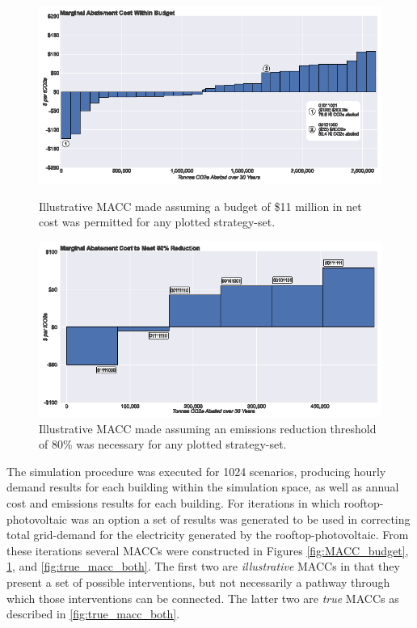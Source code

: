 \documentclass[twocolumn, a4paper,10pt]{article}
\begin{document}
\begin{figure}[hbpt]
\centering
\begin{minipage}[b]{.45\textwidth}
    \hspace*{-1.05cm}\includegraphics[scale=1.0]{figures/budget_macc.eps}
    \caption{Illustrative MACC made assuming a budget of \$11 million in net cost was permitted for any plotted strategy-set.}
    \label{fig:MACC_budget}
\end{minipage}\qquad
\begin{minipage}[b]{.45\textwidth}
    \hspace*{-.4cm}\includegraphics[scale=1.0]{figures/threshold_macc.eps}
    \caption{Illustrative MACC made assuming an emissions reduction threshold of 80\% was necessary for any plotted strategy-set.}
    \label{fig:MACC_threshold}
\end{minipage}
\end{figure}

The simulation procedure was executed for 1024 scenarios, producing hourly demand results for each building within the simulation space, as well as annual cost and emissions results for each building. For iterations in which rooftop-photovoltaic was an option a set of results was generated to be used in correcting total grid-demand for the electricity generated by the rooftop-photovoltaic. From these iterations several MACCs were constructed in Figures \ref{fig:MACC_budget}, \ref{fig:MACC_threshold}, and \ref{fig:true_macc_both}. The first two are \textit{illustrative} MACCs in that they present a set of possible interventions, but not necessarily a pathway through which those interventions can be connected. The latter two are \textit{true} MACCs as described in \ref{fig:true_macc_both}.
\end{document}
